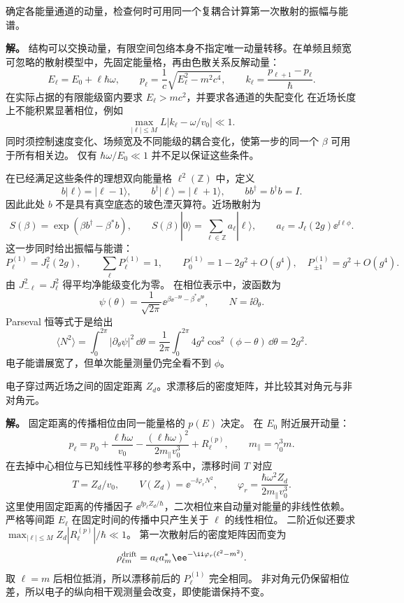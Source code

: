 \begin{exbox}
确定各能量通道的动量，检查何时可用同一个复耦合计算第一次散射的振幅与能谱。

\textbf{解。} 结构可以交换动量，有限空间包络本身不指定唯一动量转移。在单频且频宽可忽略的散射模型中，先固定能量格，再由色散关系反解动量：
\[
 E_\ell=E_0+\ell\hbar\omega,\qquad
 p_\ell=\frac1c\sqrt{E_\ell^2-m^2c^4},\qquad
 k_\ell=\frac{p_{\ell+1}-p_\ell}{\hbar}.
\]
在实际占据的有限能级窗内要求 $E_\ell>mc^2$，并要求各通道的失配变化
在近场长度上不能积累显著相位，例如
\[
 \max_{|\ell|\le M}L|k_\ell-\omega/v_0|\ll1.
\]
同时须控制速度变化、场频宽及不同能级的耦合变化，使第一步的同一个 $\beta$ 可用于所有相关边。
仅有 $\hbar\omega/E_0\ll1$ 并不足以保证这些条件。

在已经满足这些条件的理想双向能量格 $\ell^2(\mathbb Z)$ 中，定义
\[
 b|\ell\rangle=|\ell-1\rangle,\qquad
 b^\dagger|\ell\rangle=|\ell+1\rangle,\qquad
 bb^\dagger=b^\dagger b=I.
\]
因此此处 $b$ 不是具有真空底态的玻色湮灭算符。近场散射为
\[
 S(\beta)=\exp(\beta b^\dagger-\beta^*b),\qquad
 S(\beta)|0\rangle=\sum_{\ell\in\mathbb Z}a_\ell|\ell\rangle,
 \qquad a_\ell=J_\ell(2g)\ee^{\ii \ell\phi}.
\]
这一步同时给出振幅与能谱：
\[
 P_\ell^{(1)}=J_\ell^2(2g),\qquad
 \sum_\ell P_\ell^{(1)}=1,
 \qquad P_0^{(1)}=1-2g^2+O(g^4),\quad
 P_{\pm1}^{(1)}=g^2+O(g^4).
\]
由 $J_{-\ell}^2=J_\ell^2$ 得平均净能级变化为零。
在相位表示中，波函数为
\[
 \psi(\theta)=\frac{1}{\sqrt{2\pi}}
 \ee^{\beta \ee^{-\ii \theta}-\beta^*\ee^{\ii \theta}},\qquad
 N=\ii\partial_\theta.
\]
Parseval 恒等式于是给出
\[
 \langle N^2\rangle
 =\int_0^{2\pi}|\partial_\theta\psi|^2\,\dd\theta
 =\frac{1}{2\pi}\int_0^{2\pi}4g^2\cos^2(\phi-\theta)\,\dd\theta
 =2g^2.
\]
电子能谱展宽了，但单次能量测量仍完全看不到 $\phi$。
\end{exbox}

\begin{exbox}
电子穿过两近场之间的固定距离 $Z_d$。求漂移后的密度矩阵，并比较其对角元与非对角元。

\textbf{解。} 固定距离的传播相位由同一能量格的 $p(E)$ 决定。
在 $E_0$ 附近展开动量：
\[
 p_\ell=p_0+\frac{\ell\hbar\omega}{v_0}
 -\frac{(\ell\hbar\omega)^2}{2m_\parallel v_0^3}+R_\ell^{(p)},
 \qquad m_\parallel=\gamma_0^3m.
\]
在去掉中心相位与已知线性平移的参考系中，漂移时间 $T$ 对应
\[
 T=Z_d/v_0,\qquad V(Z_d)=\ee^{-\ii \varphi_rN^2},\qquad
 \varphi_r=\frac{\hbar\omega^2Z_d}{2m_\parallel v_0^3}.
\]
这里使用固定距离的传播因子 $\ee^{\ii p_\ell Z_d/\hbar}$，二次相位来自动量对能量的非线性依赖。严格等间距 $E_\ell$ 在固定时间的传播中只产生关于 $\ell$ 的线性相位。
二阶近似还要求 $\max_{|\ell|\le M}Z_d|R_\ell^{(p)}|/\hbar\ll1$。
第一次散射后的密度矩阵因而变为
\[
 \rho^{\rm drift}_{\ell m}
 =a_\ell a_m^*\ee^{-\ii \varphi_r(\ell^2-m^2)}.
\]
取 $\ell=m$ 后相位抵消，所以漂移前后的 $P_\ell^{(1)}$ 完全相同。
非对角元仍保留相位差，所以电子的纵向相干观测量会改变，即使能谱保持不变。
\end{exbox}

